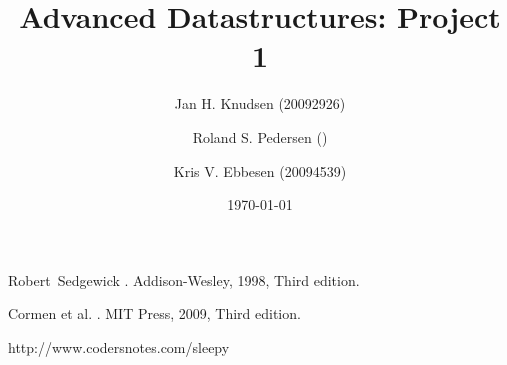 \documentclass[a4paper, 12pt]{article}
\title{Advanced Datastructures: Project 1}
\date{\today}
\author{Jan H. Knudsen (20092926)
\and
Roland S. Pedersen ()
\and
Kris V. Ebbesen (20094539)
}
\begin{document}
\maketitle

\newpage
\tableofcontents
\newpage












\begin{thebibliography}{9}

Robert~Sedgewick
.
\newblock Addison-Wesley, 1998, Third edition.

Cormen et al.
.
\newblock MIT Press, 2009, Third edition.

http://www.codersnotes.com/sleepy



\end{thebibliography}
\end{document}
